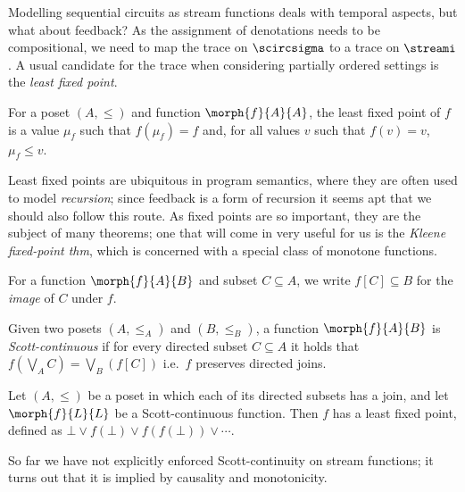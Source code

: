 \documentclass{lmcs}
\begin{document}
Modelling sequential circuits as stream functions deals with temporal
aspects, but what about feedback?
As the assignment of denotations needs to be compositional, we need
to map the trace on \(\scircsigma\) to a trace on \(\streami\).
A usual candidate for the trace when considering partially ordered settings is
the \emph{least fixed point}.

\begin{defi}
    For a poset \((A, \leq)\) and function \(\morph{f}{A}{A}\), the least
    fixed point of \(f\) is a value \(\mu_f\) such that \(f(\mu_f) = f\) and,
    for all values \(v\) such that \(f(v) = v\), \(\mu_f \leq v\).
\end{defi}

Least fixed points are ubiquitous in program semantics, where they are often
used to model \emph{recursion}; since feedback is a form of recursion it seems
apt that we should also follow this route.
As fixed points are so important, they are the subject of many theorems; one
that will come in very useful for us is the \emph{Kleene fixed-point thm},
which is concerned with a special class of monotone functions.

\begin{nota}[Image]
    For a function \(\morph{f}{A}{B}\) and subset \(C \subseteq A\), we write
    \(f[C] \subseteq B\) for the \emph{image} of \(C\) under \(f\).
\end{nota}

\begin{defi}
    Given two posets \((A, \leq_A)\) and \((B, \leq_B)\), a function
    \(\morph{f}{A}{B}\) is \emph{Scott-continuous} if for every directed
    subset \(C \subseteq A\) it holds that \(f(\bigvee_A C) = \bigvee_B(f[C])\)
    i.e.\ \(f\) preserves directed joins.
\end{defi}

\begin{thm}
    Let \((A, \leq)\) be a poset in which each of its directed subsets has a
    join, and let \(\morph{f}{L}{L}\) be a Scott-continuous function.
    Then \(f\) has a least fixed point, defined as \(
    \bot \vee f(\bot) \vee f(f(\bot)) \vee \cdots
    \).
\end{thm}

So far we have not explicitly enforced Scott-continuity on stream functions; it
turns out that it is implied by causality and monotonicity.
\end{document}
